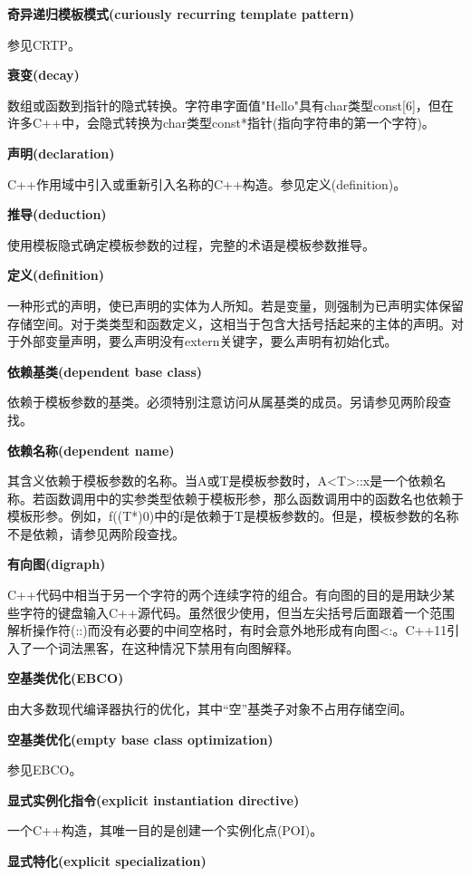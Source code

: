 \noindent
\textbf{奇异递归模板模式(curiously recurring template pattern)}

参见CRTP。

\noindent
\textbf{衰变(decay)}

数组或函数到指针的隐式转换。字符串字面值"Hello"具有char类型const[6]，但在许多C++中，会隐式转换为char类型const*指针(指向字符串的第一个字符)。

\noindent
\textbf{声明(declaration)}

C++作用域中引入或重新引入名称的C++构造。参见定义(definition)。

\noindent
\textbf{推导(deduction)}

使用模板隐式确定模板参数的过程，完整的术语是模板参数推导。

\noindent
\textbf{定义(definition)}

一种形式的声明，使已声明的实体为人所知。若是变量，则强制为已声明实体保留存储空间。对于类类型和函数定义，这相当于包含大括号括起来的主体的声明。对于外部变量声明，要么声明没有extern关键字，要么声明有初始化式。

\noindent
\textbf{依赖基类(dependent base class)}

依赖于模板参数的基类。必须特别注意访问从属基类的成员。另请参见两阶段查找。

\noindent
\textbf{依赖名称(dependent name)}

其含义依赖于模板参数的名称。当A或T是模板参数时，A<T>::x是一个依赖名称。若函数调用中的实参类型依赖于模板形参，那么函数调用中的函数名也依赖于模板形参。例如，f((T*)0)中的f是依赖于T是模板参数的。但是，模板参数的名称不是依赖，请参见两阶段查找。

\noindent
\textbf{有向图(digraph)}

C++代码中相当于另一个字符的两个连续字符的组合。有向图的目的是用缺少某些字符的键盘输入C++源代码。虽然很少使用，但当左尖括号后面跟着一个范围解析操作符(::)而没有必要的中间空格时，有时会意外地形成有向图<:。C++11引入了一个词法黑客，在这种情况下禁用有向图解释。

\noindent
\textbf{空基类优化(EBCO)}

由大多数现代编译器执行的优化，其中“空”基类子对象不占用存储空间。

\noindent
\textbf{空基类优化(empty base class optimization)}

参见EBCO。

\noindent
\textbf{显式实例化指令(explicit instantiation directive)}

一个C++构造，其唯一目的是创建一个实例化点(POI)。

\noindent
\textbf{显式特化(explicit specialization)}

